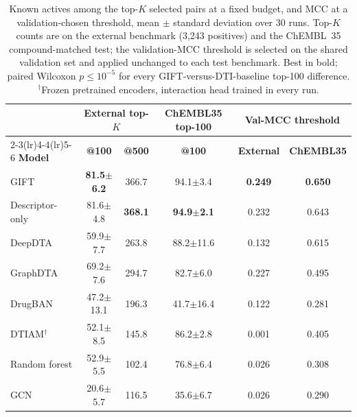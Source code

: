 \documentclass[11pt,letterpaper]{article}
\begin{document}
\begin{table}[!t]
\centering
\caption{Known actives among the top-$K$ selected pairs at a fixed budget, and MCC at a validation-chosen threshold, mean $\pm$ standard deviation over 30 runs. Top-$K$ counts are on the external benchmark (3{,}243 positives) and the ChEMBL~35 compound-matched test; the validation-MCC threshold is selected on the shared validation set and applied unchanged to each test benchmark. Best in bold; paired Wilcoxon $p\leq10^{-5}$ for every GIFT-versus-DTI-baseline top-100 difference. $^{\dagger}$Frozen pretrained encoders, interaction head trained in every run.}
\label{tab:fixed_budget}
\small
\begin{tabular}{lccccc}
\toprule
 & \multicolumn{2}{c}{\textbf{External top-$K$}} & \textbf{ChEMBL35 top-100} & \multicolumn{2}{c}{\textbf{Val-MCC threshold}} \\
\cmidrule(lr){2-3}\cmidrule(lr){4-4}\cmidrule(lr){5-6}
\textbf{Model} & \textbf{@100} & \textbf{@500} & \textbf{@100} & \textbf{External} & \textbf{ChEMBL35} \\
\midrule
GIFT             & \textbf{81.5$\pm$6.2} & 366.7 & 94.1$\pm$3.4 & \textbf{0.249} & \textbf{0.650} \\
Descriptor-only  & 81.6$\pm$4.8 & \textbf{368.1} & \textbf{94.9$\pm$2.1} & 0.232 & 0.643 \\
\midrule
DeepDTA          & 59.9$\pm$7.7 & 263.8 & 88.2$\pm$11.6 & 0.132 & 0.615 \\
GraphDTA         & 69.2$\pm$7.6 & 294.7 & 82.7$\pm$6.0 & 0.227 & 0.495 \\
DrugBAN          & 47.2$\pm$13.1 & 196.3 & 41.7$\pm$16.4 & 0.122 & 0.281 \\
DTIAM$^{\dagger}$ & 52.1$\pm$8.5 & 145.8 & 86.2$\pm$2.8 & 0.001 & 0.405 \\
Random forest    & 52.9$\pm$5.5 & 102.4 & 76.8$\pm$6.4 & 0.026 & 0.308 \\
GCN              & 20.6$\pm$5.7 & 116.5 & 35.6$\pm$6.7 & 0.026 & 0.290 \\
\bottomrule
\end{tabular}
\end{table}
\end{document}
